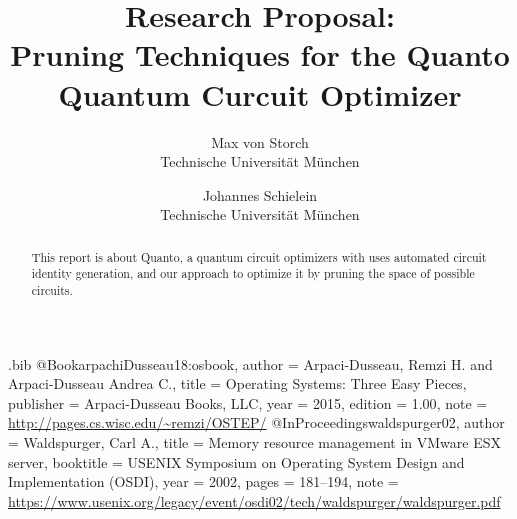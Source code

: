 \renewcommand\theadalign{bc}
\renewcommand\theadfont{\bfseries}

\usepackage{filecontents}

\begin{filecontents}{\jobname.bib}
@Book{arpachiDusseau18:osbook,
  author =       {Arpaci-Dusseau, Remzi H. and Arpaci-Dusseau Andrea C.},
  title =        {Operating Systems: Three Easy Pieces},
  publisher =    {Arpaci-Dusseau Books, LLC},
  year =         2015,
  edition =      {1.00},
  note =         {\url{http://pages.cs.wisc.edu/~remzi/OSTEP/}}
}
@InProceedings{waldspurger02,
  author =       {Waldspurger, Carl A.},
  title =        {Memory resource management in {VMware ESX} server},
  booktitle =    {USENIX Symposium on Operating System Design and
                  Implementation (OSDI)},
  year =         2002,
  pages =        {181--194},
  note =         {\url{https://www.usenix.org/legacy/event/osdi02/tech/waldspurger/waldspurger.pdf}}}
\end{filecontents}



\date{}

\title{\Large \bf Research Proposal: \\Pruning Techniques for the Quanto Quantum Curcuit Optimizer}

\author{
{\rm Max von Storch}\\
Technische Universität München
\and
{\rm Johannes Schielein}\\
Technische Universität München
} %

\maketitle

\begin{abstract}
This report is about Quanto, a quantum circuit optimizers with uses automated circuit identity generation, and our approach to optimize
it by pruning the space of possible circuits.   
\end{abstract}


